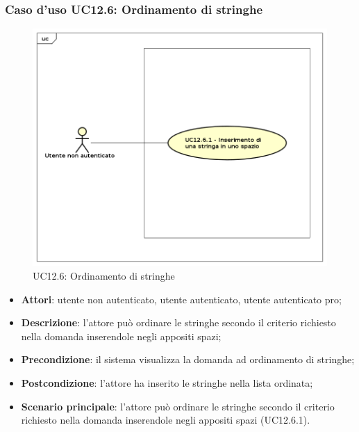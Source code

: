 \subsubsection{Caso d'uso UC12.6: Ordinamento di stringhe}
\label{UC12.6}
\begin{figure}[h]
	\centering
	\includegraphics[scale=0.5]{UML/UC12_6.png}
	\caption{UC12.6: Ordinamento di stringhe}
\end{figure}
\begin{itemize}
\item \textbf{Attori}: utente non autenticato, utente autenticato, utente autenticato pro;
\item \textbf{Descrizione}: l'attore può ordinare le stringhe secondo il criterio richiesto nella domanda inserendole negli appositi spazi;
\item \textbf{Precondizione}: il sistema visualizza la domanda ad ordinamento di stringhe;
\item \textbf{Postcondizione}: l'attore ha inserito le stringhe nella lista ordinata;
\item \textbf{Scenario principale}: l'attore può ordinare le stringhe secondo il criterio richiesto nella domanda inserendole negli appositi spazi (UC12.6.1).
\end{itemize}

\newpage
